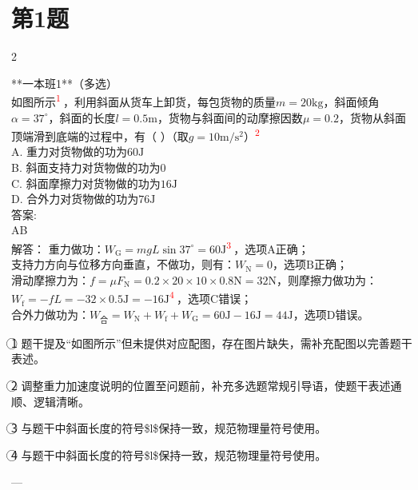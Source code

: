 \documentclass[12pt,a4paper]{ctexart}
\newlength{\colwidthinner}
\newcommand{\calccolwidth}{%
  \setlength{\colwidthinner}{\dimexpr\linewidth-2\fboxsep-2\fboxrule\relax}%
}
\newcommand{\correctionbox}[1]{%
  \calccolwidth
  \colorbox{blue!8}{\parbox{\colwidthinner}{#1}}%
}
\begin{document}
\section*{第1题}
\begin{paracol}{2}

**一本班1**（多选）\\
如图所示\textsuperscript{\textcolor{red}{\textcircled{1}}}，利用斜面从货车上卸货，每包货物的质量$m=20\mathrm{kg}$，斜面倾角$\alpha ={37}^{\circ }$，斜面的长度$l=0.5\mathrm{m}$，货物与斜面间的动摩擦因数$\mu =0.2$，货物从斜面顶端滑到底端的过程中，有（ ）（取$g=10\mathrm{m}/{\mathrm{s}}^{2}$）\textsuperscript{\textcolor{red}{\textcircled{2}}}\\
A.                                  重力对货物做的功为$60\mathrm{J}$\\
B.                                  斜面支持力对货物做的功为$0$\\
C.                                  斜面摩擦力对货物做的功为$16\mathrm{J}$\\
D.                                  合外力对货物做的功为$76\mathrm{J}$\\
答案:\\
AB\\
解答：                             重力做功：${W}_{\mathrm G}=mgL\sin {37}^{\circ }=60\mathrm{J}$\textsuperscript{\textcolor{red}{\textcircled{3}}}，选项$\mathrm{A}$正确；\\
支持力方向与位移方向垂直，不做功，则有：${W}_{\mathrm N}=0$，选项$\mathrm{B}$正确；\\
滑动摩擦力为：$f=\mu {F}_{\mathrm{N}}=0.2\times 20\times 10\times 0.8\mathrm{N}=32\mathrm{N}$，则摩擦力做功为：${W}_{\mathrm{f}}=-fL=-32\times 0.5\mathrm{J}=-16\mathrm{J}$\textsuperscript{\textcolor{red}{\textcircled{4}}}，选项$\mathrm{C}$错误；\\
合外力做功为：${W}_{合}={W}_{\mathrm{N}}+{W}_{\mathrm{f}}+{W}_{\mathrm{G}}=60\mathrm{J}-16\mathrm{J}=44\mathrm{J}$，选项$\mathrm{D}$错误。\\

\switchcolumn

\correctionbox{\textcircled{1} 题干提及“如图所示”但未提供对应配图，存在图片缺失，需补充配图以完善题干表述。}
\medskip

\correctionbox{\textcircled{2} 调整重力加速度说明的位置至问题前，补充多选题常规引导语，使题干表述通顺、逻辑清晰。}
\medskip

\correctionbox{\textcircled{3} 与题干中斜面长度的符号\$l\$保持一致，规范物理量符号使用。}
\medskip

\correctionbox{\textcircled{4} 与题干中斜面长度的符号\$l\$保持一致，规范物理量符号使用。

---}
\medskip

\switchcolumn*

\end{paracol}
\end{document}
